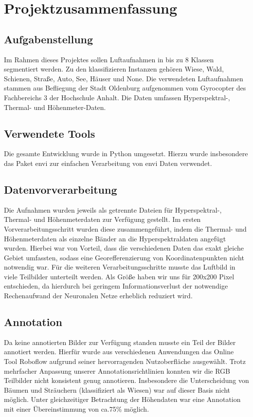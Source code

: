 \newpage %

\chapter{Projektzusammenfassung}\thispagestyle{fancy}

\section{Aufgabenstellung}
Im Rahmen dieses Projektes sollen Luftaufnahmen in bis zu 8 Klassen segmentiert werden.
Zu den klassifizieren Instanzen gehören Wiese, Wald, Schienen, Straße, Auto, See, Häuser und None.
Die verwendeten Luftaufnahmen stammen aus Befliegung der Stadt Oldenburg aufgenommen vom Gyrocopter des Fachbereichs 3
der Hochschule Anhalt.
Die Daten umfassen Hyperspektral-, Thermal- und Höhenmeter-Daten.

\section{Verwendete Tools}
Die gesamte Entwicklung wurde in Python umgesetzt.
Hierzu wurde insbesondere das Paket envi zur einfachen Verarbeitung von  envi Daten verwendet.

\section{Datenvorverarbeitung}
Die Aufnahmen wurden jeweils als getrennte Dateien für Hyperspektral-, Thermal- und Höhenmeterdaten zur Verfügung gestellt.
Im ersten Vorverarbeitungsschritt wurden diese zusammengeführt, indem die Thermal- und Höhenmeterdaten als einzelne Bänder an die Hyperspektraldaten angefügt wurden.
Hierbei war von Vorteil, dass die verschiedenen Daten das exakt gleiche Gebiet umfassten, sodass eine Georefferenzierung von Koordinatenpunkten nicht notwendig war.
Für die weiteren Verarbeitungsschritte musste das Luftbild in viele Teilbilder unterteilt werden.
Als Größe haben wir uns für 200x200 Pixel entschieden, da hierdurch bei geringem Informationsverlust der notwendige Rechenaufwand der Neuronalen Netze erheblich reduziert wird.


\section{Annotation}
Da keine annotierten Bilder zur Verfügung standen musste ein Teil der Bilder annotiert werden.
Hierfür wurde aus verschiedenen Anwendungen das Online Tool Roboflow aufgrund seiner hervorragenden Nutzoberfläche ausgewählt.
Trotz mehrfacher Anpassung unserer Annotationsrichtlinien konnten wir die RGB Teilbilder nicht konsistent genug annotieren.
Insbesondere die Unterscheidung von Bäumen und Sträuchern (klassifiziert als Wiesen) war auf dieser Basis nicht möglich.
Unter gleichzeitiger Betrachtung der Höhendaten war eine Annotation mit einer Übereinstimmung von ca.75\% möglich.

